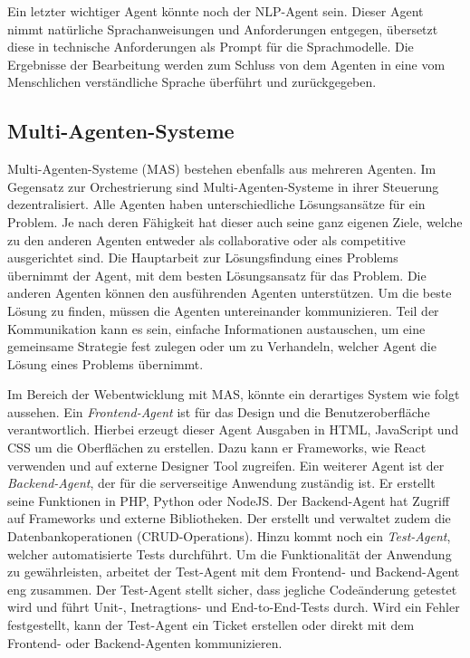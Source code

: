 Ein letzter wichtiger Agent könnte noch der NLP-Agent sein. Dieser Agent nimmt natürliche Sprachanweisungen und Anforderungen entgegen, übersetzt diese in technische Anforderungen als Prompt für die Sprachmodelle. Die Ergebnisse der Bearbeitung werden zum Schluss von dem Agenten in eine vom Menschlichen verständliche Sprache überführt und zurückgegeben.

\subsection{Multi-Agenten-Systeme}
Multi-Agenten-Systeme (\acrshort{MAS}) bestehen ebenfalls aus mehreren Agenten. Im Gegensatz zur Orchestrierung sind Multi-Agenten-Systeme in ihrer Steuerung dezentralisiert. Alle Agenten haben unterschiedliche Lösungsansätze für ein Problem. Je nach deren Fähigkeit hat dieser auch seine ganz eigenen Ziele, welche zu den anderen Agenten entweder als \gls{collaborative} oder als \gls{competitive} ausgerichtet sind. Die Hauptarbeit zur Lösungsfindung eines Problems übernimmt der Agent, mit dem besten Lösungsansatz für das Problem. Die anderen Agenten können den ausführenden Agenten unterstützen. Um die beste Lösung zu finden, müssen die Agenten untereinander kommunizieren.  Teil der Kommunikation kann es sein, einfache Informationen austauschen, um eine gemeinsame Strategie fest zulegen oder um zu Verhandeln, welcher Agent die Lösung eines Problems übernimmt.\vspace{0.2cm}

Im Bereich der Webentwicklung mit MAS, könnte ein derartiges System wie folgt aussehen. Ein \textit{Frontend-Agent} ist für das Design und die Benutzeroberfläche verantwortlich. Hierbei erzeugt dieser Agent Ausgaben in HTML, JavaScript und CSS um die Oberflächen zu erstellen. Dazu kann er Frameworks, wie React verwenden und auf externe Designer Tool zugreifen. Ein weiterer Agent ist der \textit{Backend-Agent}, der für die serverseitige Anwendung zuständig ist. Er erstellt seine Funktionen in PHP, Python oder NodeJS. Der Backend-Agent hat Zugriff auf Frameworks und externe Bibliotheken. Der erstellt und verwaltet zudem die Datenbankoperationen (CRUD-Operations). Hinzu kommt noch ein \textit{Test-Agent}, welcher automatisierte Tests durchführt. Um die Funktionalität der Anwendung zu gewährleisten, arbeitet der Test-Agent mit dem Frontend- und Backend-Agent eng zusammen. Der Test-Agent stellt sicher, dass jegliche Codeänderung getestet wird und führt Unit-, Inetragtions- und End-to-End-Tests durch. Wird ein Fehler festgestellt, kann der Test-Agent ein Ticket erstellen oder direkt mit dem Frontend- oder Backend-Agenten kommunizieren.\vspace{0.2cm}

